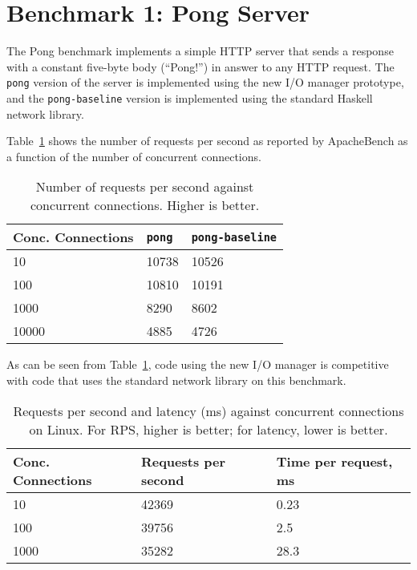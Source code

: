 \documentclass[a4paper,11pt,oneside]{report}
\begin{document}
\section{Benchmark 1: Pong Server}

The Pong benchmark implements a simple HTTP server that sends a response
with a constant five-byte body (``Pong!'') in answer to any HTTP request. The
\texttt{pong} version of the server is implemented using the new I/O manager
prototype, and the \texttt{pong-baseline} version is implemented using the
standard Haskell network library.

Table~\ref{tbl:pong} shows the number of requests per second as reported by
ApacheBench as a function of the number of concurrent connections.

\begin{table}[h!]
\centering
\begin{tabular}{ | l | l | l | }
  \hline
  Conc. Connections & \texttt{pong} & \texttt{pong-baseline} \\
  \hline
  10 & 10738 & 10526 \\
  \hline
  100 & 10810 & 10191 \\
  \hline
  1000 & 8290 & 8602 \\
  \hline
  10000 & 4885 & 4726 \\
  \hline
\end{tabular}
\caption{Number of requests per second against concurrent connections. Higher is better.}
\label{tbl:pong}
\end{table}

As can be seen from Table~\ref{tbl:pong}, code using the new I/O manager is
competitive with code that uses the standard network library on this benchmark.

\begin{table}[h!]
\centering
\begin{tabular}{ | l | l | l | }
  \hline
  Conc. Connections & Requests per second & Time per request, ms \\
  \hline
  10 & 42369 & 0.23 \\
  \hline
  100 & 39756 & 2.5 \\
  \hline
  1000 & 35282 & 28.3 \\
  \hline
\end{tabular}
\caption{Requests per second and latency (ms) against concurrent connections on
  Linux. For RPS, higher is better; for latency, lower is better.}
\label{tbl:pong-linux}
\end{table}
\end{document}
